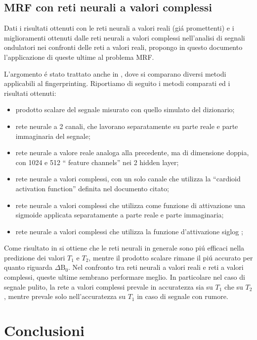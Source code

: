 \documentclass[a4paper,12pt]{report}
\begin{document}
 
 
 \section{MRF con reti neurali a valori complessi}
 
 Dati i risultati ottenuti con le reti neurali a valori reali (gi\'a promettenti) e i miglioramenti ottenuti dalle reti neurali a valori complessi nell'analisi di segnali ondulatori nei confronti delle reti a valori reali, propongo in questo documento l'applicazione di queste ultime al problema MRF.
 
 L'argomento \'e stato trattato anche in \cite{virtue2017better}, dove si comparano diversi metodi applicabili al fingerprinting. 
 Riportiamo di seguito i metodi comparati ed i risultati ottenuti:
 \begin{itemize}
  \item prodotto scalare del segnale misurato con quello simulato del dizionario;
  \item rete neurale a 2 canali, che lavorano separatamente su parte reale e parte immaginaria del segnale;
  \item rete neurale a valore reale analoga alla precedente, ma di dimensione doppia, con 1024 e 512 `` feature channels'' nei 2 hidden layer;
  \item rete neurale a valori complessi, con un solo canale che utilizza la ``cardioid activation function'' definita nel documento citato;
  \item rete neurale a valori complessi che utilizza come funzione di attivazione una sigmoide applicata separatamente a parte reale e parte immaginaria;
  \item rete neurale a valori complessi che utilizza la funzione d'attivazione siglog \cite{georgiou1992complex};
 \end{itemize}

 Come risultato in \cite{virtue2017better} si ottiene che le reti neurali in generale sono pi\'u efficaci nella predizione dei valori $T_1$ e $T_2$, mentre il prodotto scalare rimane il pi\'u accurato per quanto riguarda $\Delta\mbox{B}_0$. 
 Nel confronto tra reti neurali a valori reali e reti a valori complessi, queste ultime sembrano performare meglio. 
 In particolare nel caso di segnale pulito, la rete a valori complessi prevale in accuratezza sia su $T_1$ che su $T_2$, mentre prevale solo nell'accuratezza su $T_1$ in caso di segnale con rumore.

 
 \chapter*{Conclusioni}
 
\end{document}
